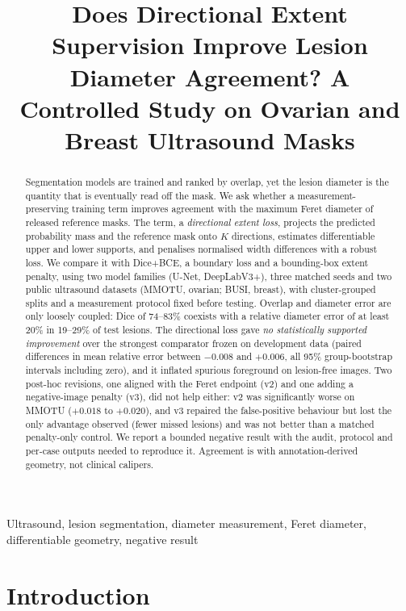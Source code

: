 \documentclass{midl}
\title[Directional extent supervision for lesion diameter]{Does Directional Extent Supervision Improve Lesion Diameter Agreement? A Controlled Study on Ovarian and Breast Ultrasound Masks}
\begin{document}
\maketitle

\begin{abstract}
Segmentation models are trained and ranked by overlap, yet the lesion diameter is the quantity that is eventually read off the mask. We ask whether a measurement-preserving training term improves agreement with the maximum Feret diameter of released reference masks. The term, a \emph{directional extent loss}, projects the predicted probability mass and the reference mask onto $K$ directions, estimates differentiable upper and lower supports, and penalises normalised width differences with a robust loss. We compare it with Dice+BCE, a boundary loss and a bounding-box extent penalty, using two model families (U-Net, DeepLabV3+), three matched seeds and two public ultrasound datasets (MMOTU, ovarian; BUSI, breast), with cluster-grouped splits and a measurement protocol fixed before testing. Overlap and diameter error are only loosely coupled: Dice of 74--83\% coexists with a relative diameter error of at least 20\% in 19--29\% of test lesions. The directional loss gave \emph{no statistically supported improvement} over the strongest comparator frozen on development data (paired differences in mean relative error between $-0.008$ and $+0.006$, all 95\% group-bootstrap intervals including zero), and it inflated spurious foreground on lesion-free images. Two post-hoc revisions, one aligned with the Feret endpoint (v2) and one adding a negative-image penalty (v3), did not help either: v2 was significantly worse on MMOTU ($+0.018$ to $+0.020$), and v3 repaired the false-positive behaviour but lost the only advantage observed (fewer missed lesions) and was not better than a matched penalty-only control. We report a bounded negative result with the audit, protocol and per-case outputs needed to reproduce it. Agreement is with annotation-derived geometry, not clinical calipers.
\end{abstract}

\begin{keywords}
Ultrasound, lesion segmentation, diameter measurement, Feret diameter, differentiable geometry, negative result
\end{keywords}

\section{Introduction}
\end{document}
